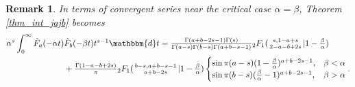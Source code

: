 \documentclass[12pt]{article}
\newcommand{\ee}[0] {\mathbbm{e}}
\newcommand{\ii}[0] {\mathbbm{i}}
\newcommand{\dd}[0] {\mathbbm{d}}
\numberwithin{equation}{section}
\newtheorem{remark}[theorem]{Remark}
\newcommand{\Head}[3] {{}_{#1}{#2}_{#3}}
\newcommand{\ArgS}[3] {( \begin{smallmatrix} #1 \\ #2 \end{smallmatrix} | {#3})}
\newcommand{\HypJreg}[2] {{\tilde{F}}_{#1}(#2)}
\begin{document}
\begin{remark}
In terms of convergent series near the critical case $\alpha=\beta$, Theorem \ref{thm_int_jajb} becomes
\begin{align*}
\alpha^s \int_{0}^{\infty} \HypJreg{a}{-\alpha t} & \HypJreg{b}{-\beta t} t^{s-1} \dd t
= \tfrac{\Gamma(a + b - 2 s-1) \Gamma(s)}{\Gamma(a - s)\Gamma(b - s)\Gamma(a + b - s-1)} \Head2F1 \ArgS{s, 1 - a + s}{2 - a - b + 2 s}{1 - \tfrac{\beta}{\alpha}}\\
&+ \tfrac{\Gamma(1-a - b + 2 s)}{\pi} \Head2F1 \ArgS{b-s, a+b-s-1}{a + b - 2 s}{1 - \tfrac{\beta}{\alpha}}
\begin{cases}
\sin \pi (a-s) (1-\tfrac{\beta}{\alpha})^{a+b-2s-1}\text{,} & \beta < \alpha\\
\sin \pi (b-s) (\tfrac{\beta}{\alpha}-1)^{a+b-2s-1} \text{,} & \beta > \alpha
\end{cases}\text{.}
\end{align*}
\end{remark}
\end{document}
